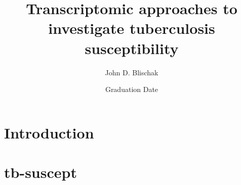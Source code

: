 \documentclass{ucetd}
\title{Transcriptomic approaches to investigate tuberculosis susceptibility}
\author{John D. Blischak}
\date{Graduation Date}
\begin{document}
\maketitle

\makecopyright
\makededication


\tableofcontents
\listoffigures
\listoftables

\acknowledgments



\mainmatter

\chapter{Introduction}



\chapter{tb-suscept}\label{ch:tb-suscept}





\makebibliography

%
%
\end{document}
